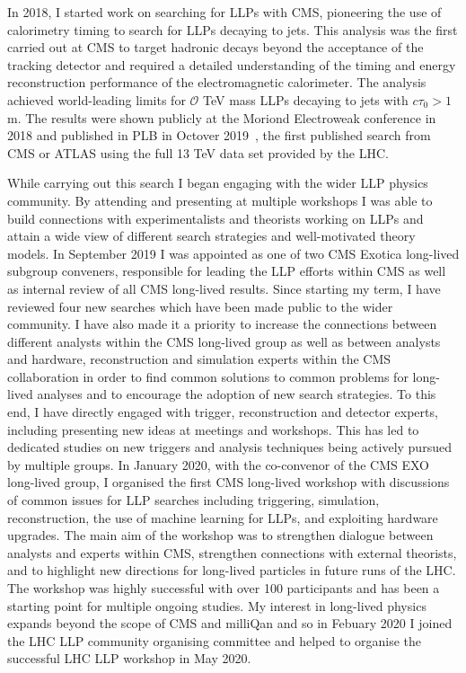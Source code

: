 \documentclass[11pt]{article}
\theoremstyle{plain} \numberwithin{equation}{section}
\theoremstyle{definition}
\newcounter{list}
\begin{document}
In 2018, I started work on searching for LLPs with CMS, 
pioneering the use of calorimetry timing to search for LLPs decaying to jets. This analysis was the first carried 
out at CMS to target hadronic decays beyond the acceptance of the tracking detector and required a detailed
understanding of the timing and energy reconstruction performance of the electromagnetic calorimeter. The analysis achieved 
world-leading limits for $\mathcal{O}$ TeV mass LLPs decaying to jets with $c\tau_{0} > 1$ m. 
The results were shown publicly at the Moriond Electroweak conference in 2018 and published in PLB in Octover 2019~\cite{2019134876}, 
the first published search from CMS or ATLAS using the full 13 TeV data set provided by the LHC. 

While carrying out this search I began engaging with the wider LLP physics community. 
By attending and presenting at multiple workshops I was able to build connections with 
experimentalists and theorists working on LLPs and attain a wide view of different 
search strategies and well-motivated theory models. In September 2019 I was appointed as
one of two CMS Exotica long-lived subgroup conveners, responsible for leading the 
LLP efforts within CMS as well as internal review of all CMS long-lived results. Since starting
my term, I have reviewed four new searches which have been made public to the wider community.
I have also made it a priority to increase the connections between different analysts within the
CMS long-lived group as well as between analysts and hardware, reconstruction 
and simulation experts within the CMS collaboration in order to find common solutions to 
common problems for long-lived analyses and to encourage the
adoption of new search strategies. To this end, I have directly engaged with
trigger, reconstruction and detector experts, including presenting new ideas at
meetings and workshops. This has led to dedicated studies on new triggers and 
analysis techniques being actively pursued by multiple groups. 
In January 2020, with the co-convenor of the CMS EXO long-lived group, I 
organised the first CMS long-lived workshop with discussions 
of common issues for LLP searches including triggering, simulation, reconstruction, 
the use of machine learning for LLPs, and exploiting hardware upgrades. 
The main aim of the workshop was to strengthen dialogue between analysts and experts within CMS,
strengthen connections with external theorists, and to highlight new directions 
for long-lived particles in future runs of the LHC.  
The workshop was highly successful with over 100 participants and has been a starting 
point for multiple ongoing studies. My interest in long-lived physics expands beyond the scope of CMS
and milliQan and so in Febuary 2020 I joined the LHC LLP community organising committee 
and helped to organise the successful LHC LLP workshop in May 2020.
\end{document}
